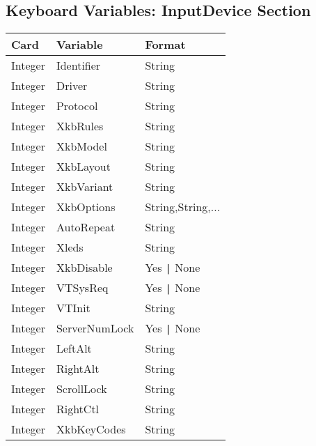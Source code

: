 \subsection{Keyboard Variables: InputDevice Section}
\begin{tabular}[h]{|p{2cm}|p{4cm}|p{7cm}|}
 \hline
 \textbf{Card} & \textbf{Variable}     & \textbf{Format}        \\
 \hline
 Integer & Identifier       & String                             \\
 Integer & Driver           & String                             \\
 Integer & Protocol         & String                             \\
 Integer & XkbRules         & String                             \\
 Integer & XkbModel         & String                             \\
 Integer & XkbLayout        & String                             \\
 Integer & XkbVariant       & String                             \\
 Integer & XkbOptions       & String,String,...                  \\
 Integer & AutoRepeat       & String                             \\
 Integer & Xleds            & String                             \\
 Integer & XkbDisable       & Yes \verb+|+ None                  \\
 Integer & VTSysReq         & Yes \verb+|+ None                  \\
 Integer & VTInit           & String                             \\
 Integer & ServerNumLock    & Yes \verb+|+ None                  \\
 Integer & LeftAlt          & String                             \\
 Integer & RightAlt         & String                             \\
 Integer & ScrollLock       & String                             \\
 Integer & RightCtl         & String                             \\
 Integer & XkbKeyCodes      & String                             \\
 \hline
\end{tabular}


\newpage
{}

